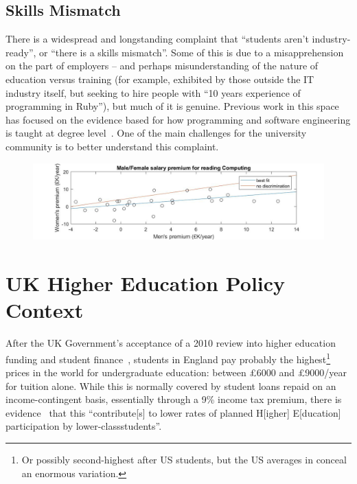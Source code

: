 \documentclass[sigconf,anonymous]{acmart}
\begin{document}
\subsection{Skills Mismatch}\label{sec:Skills}

There is a widespread and longstanding complaint that ``students
aren't industry-ready'', or ``there is a skills mismatch''. Some of
this is due to a misapprehension on the part of employers -- and
perhaps misunderstanding of the nature of education versus training
(for example, exhibited by those outside the IT industry itself, but
seeking to hire people with ``10 years experience of programming in
Ruby''), but much of it is genuine. Previous work in this space has
focused on the evidence based for how programming and software
engineering is taught at degree
level~\cite{davenport-et-al:latice2016,murphy-et-al:programming2017,simon-et-al:sigcse2018}. One
of the main challenges for the university community is to better
understand this complaint.

\begin{figure}
\includegraphics[width=\textwidth]{images/BBCSalaryDatav5.jpg}
\caption{\label{fig:BBC}}
\end{figure}

\section{UK Higher Education Policy Context}\label{ukhepolicy}

After the UK Government's acceptance of a 2010 review into higher
education funding and student finance~\cite{BIS2010a}, students in
England pay probably the highest\footnote{Or possibly second-highest
after US students, but the US averages in \cite[Table B5.1]{OECD2016a}
conceal an enormous variation.} prices in the world for undergraduate
education: between \pounds6000 and \pounds9000/year for tuition
alone. While this is normally covered by student loans repaid on an
income-contingent basis, essentially through a 9\% income tax premium,
there is evidence~\cite{CallenderMason2017a} that this ``contribute[s]
to lower rates of planned H[igher] E[ducation] participation by
lower-classstudents''.
\end{document}

